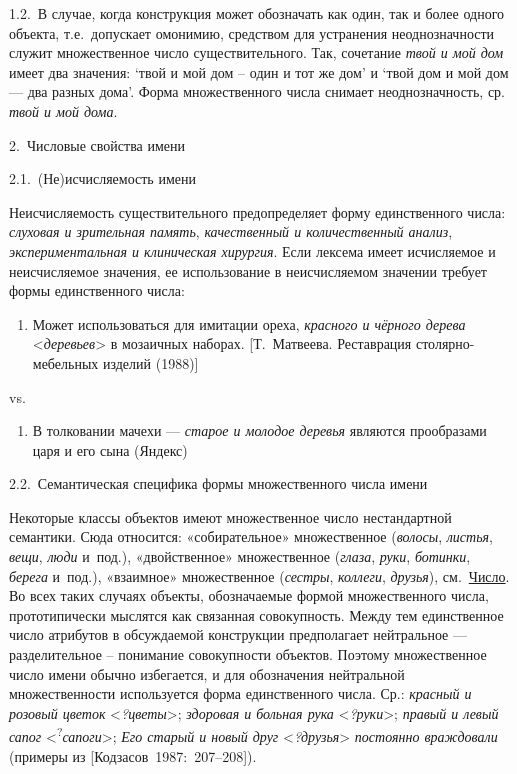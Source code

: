 1.2.~В случае, когда конструкция может обозначать как один, так и более
одного объекта, т.е.~допускает омонимию, средством для устранения
неоднозначности служит множественное число существительного. Так,
сочетание \textit{твой и мой дом} имеет два значения: `твой и мой дом --
один и тот же дом' и `твой дом и мой дом --- два разных дома'. Форма
множественного числа снимает неоднозначность, ср. \textit{твой и мой
дома}.

2.~Числовые свойства имени

2.1.~(Не)исчисляемость имени

Неисчисляемость существительного предопределяет форму единственного
числа: \textit{слуховая и зрительная память}, \textit{качественный и
количественный анализ}, \textit{экспериментальная и клиническая хирургия}.
Если лексема имеет исчисляемое и неисчисляемое значения, ее
использование в неисчисляемом значении требует формы единственного
числа:

\begin{enumerate}
\def\labelenumi{(\arabic{enumi})}
\setcounter{enumi}{143}
\item
  Может использоваться для имитации ореха, \textit{красного и чёрного
  дерева} \textless*\textit{деревьев}\textgreater{} в мозаичных наборах.
  {[}Т.~Матвеева. Реставрация столярно-мебельных изделий (1988){]}
\end{enumerate}

vs.

\begin{enumerate}
\def\labelenumi{(\arabic{enumi})}
\setcounter{enumi}{144}
\item
  В толковании мачехи --- \textit{старое и молодое деревья} являются
  прообразами царя и его сына (Яндекс)
\end{enumerate}

2.2.~Семантическая специфика формы множественного числа имени

Некоторые классы объектов имеют множественное число нестандартной
семантики. Сюда относится: «собирательное» множественное (\textit{волосы},
\textit{листья}, \textit{вещи}, \textit{люди} и~под.), «двойственное»
множественное (\textit{глаза}, \textit{руки}, \textit{ботинки}, \textit{берега}
и~под.), «взаимное» множественное (\textit{сестры}, \textit{коллеги},
\textit{друзья}), см.~\underline{Число}. Во всех таких случаях объекты,
обозначаемые формой множественного числа, прототипически мыслятся как
связанная совокупность. Между тем единственное число атрибутов в
обсуждаемой конструкции предполагает нейтральное --- разделительное --
понимание совокупности объектов. Поэтому множественное число имени
обычно избегается, и для обозначения нейтральной множественности
используется форма единственного числа. Ср.: \textit{красный и розовый
цветок} \textless{}\textit{?цветы}\textgreater; \textit{здоровая и больная
рука} \textless{}\textit{?руки}\textgreater; \textit{правый и левый сапог}
\textless{}\textsuperscript{?}\textit{сапоги}\textgreater; \textit{Его
старый и новый друг} \textless{}\textit{?друзья}\textgreater{}
\textit{постоянно враждовали} (примеры из {[}Кодзасов~1987:~207--208{]}).

